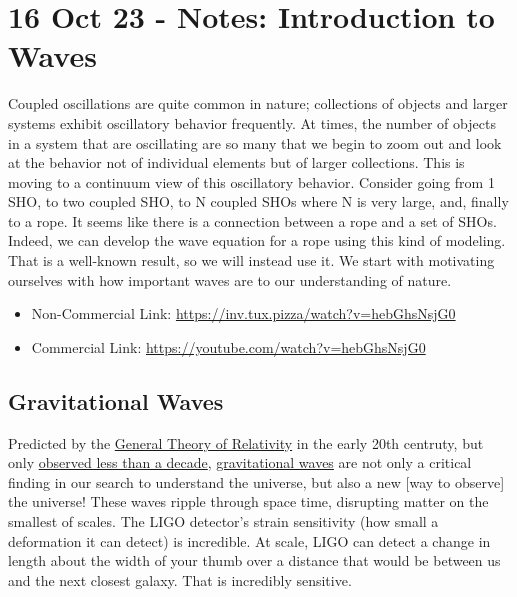 \section{16 Oct 23 - Notes: Introduction to
Waves}\label{oct-23---notes-introduction-to-waves}

Coupled oscillations are quite common in nature; collections of objects
and larger systems exhibit oscillatory behavior frequently. At times,
the number of objects in a system that are oscillating are so many that
we begin to zoom out and look at the behavior not of individual elements
but of larger collections. This is moving to a continuum view of this
oscillatory behavior. Consider going from 1 SHO, to two coupled SHO, to
N coupled SHOs where N is very large, and, finally to a rope. It seems
like there is a connection between a rope and a set of SHOs. Indeed, we
can develop the wave equation for a rope using this kind of modeling.
That is a well-known result, so we will instead use it. We start with
motivating ourselves with how important waves are to our understanding
of nature.

\href{https://inv.tux.pizza/watch?v=hebGhsNsjG0}{\pandocbounded{\texttt{[image: https://markdown-videos-api.jorgenkh.no/youtube/hebGhsNsjG0?width=720\&height=405]}}}

\begin{itemize}
\tightlist
\item
  Non-Commercial Link: \url{https://inv.tux.pizza/watch?v=hebGhsNsjG0}
\item
  Commercial Link: \url{https://youtube.com/watch?v=hebGhsNsjG0}
\end{itemize}

\subsection{Gravitational Waves}\label{gravitational-waves}

Predicted by the
\href{https://en.wikipedia.org/wiki/General_relativity}{General Theory
of Relativity} in the early 20th centruty, but only
\href{https://news.mit.edu/2016/ligo-first-detection-gravitational-waves-0211}{observed
less than a decade},
\href{https://en.wikipedia.org/wiki/First_observation_of_gravitational_waves}{gravitational
waves} are not only a critical finding in our search to understand the
universe, but also a new {[}way to observe{]} the universe! These waves
ripple through space time, disrupting matter on the smallest of scales.
The LIGO detector's strain sensitivity (how small a deformation it can
detect) is incredible. At scale, LIGO can detect a change in length
about the width of your thumb over a distance that would be between us
and the next closest galaxy. That is incredibly sensitive.

